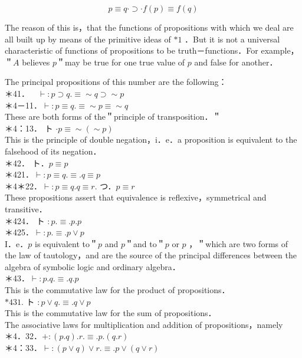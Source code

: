 \documentclass[10pt]{article}
\begin{document}
$$
p \equiv q \cdot \supset \cdot f(p) \equiv f(q)
$$

The reason of this is，that the functions of propositions with which we deal are all built up by means of the primitive ideas of $* 1$ ．But it is not a universal characteristic of functions of propositions to be truth－functions．For example， ＂$A$ believes $p$＂may be true for one true value of $p$ and false for another．

The principal propositions of this number are the following：\\
＊41．$\quad \vdash: p \supset q . \equiv \sim q \supset \sim p$\\
＊4－11．$\vdash: p \equiv q . \equiv \sim p \equiv \sim q$\\
These are both forms of the＂principle of transposition．＂\\
＊4：13． ト $\cdot p \equiv \sim(\sim p)$\\
This is the principle of double negation，i．e．a proposition is equivalent to the falsehood of its negation．\\
＊42． ト．$p \equiv p$\\
＊421．$\vdash: p \equiv q . \equiv . q \equiv p$\\
＊4＊22．$\vdash: p \equiv q . q \equiv r$. つ．$p \equiv r$\\
These propositions assert that equivalence is reflexive，symmetrical and transitive．\\
＊424． ト $: p . \equiv . p . p$\\
＊425．$\vdash: p . \equiv . p \vee p$\\
I．e．$p$ is equivalent to＂$p$ and $p$＂and to＂$p$ or $p$ ，＂which are two forms of the law of tautology，and are the source of the principal differences between the algebra of symbolic logic and ordinary algebra．\\
＊43．$\vdash: p . q . \equiv . q . p$\\
This is the commutative law for the product of propositions．\\
$* 431$. ト $: p \vee q . \equiv . q \vee p$\\
This is the commutative law for the sum of propositions．\\
The associative laws for multiplication and addition of propositions，namely\\
＊4．32．$+:(p . q) . r . \equiv . p .(q . r)$\\
＊4：33．$\vdash:(p \vee q) \vee r . \equiv . p \vee(q \vee r)$\\
\end{document}
